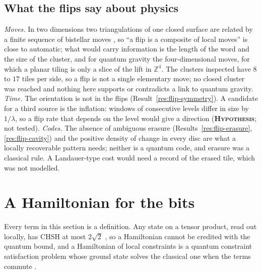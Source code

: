 \documentclass[11pt]{article}
\newcommand{\hypo}{\textbf{\textsc{Hypothesis}}}
\theoremstyle{definition}
\begin{document}
\subsection{What the flips say about physics}\label{sec:flips-physics}
\emph{Moves.} In two dimensions two triangulations of one closed surface are related by a finite sequence of bistellar moves \cite{pachner1991}, so ``a flip is a composite of local moves'' is close to automatic; what would carry information is the length of the word and the size of the cluster, and for quantum gravity the four-dimensional moves, for which a planar tiling is only a slice of the lift in $\mathbb{Z}^4$. The clusters inspected have $8$ to $17$ tiles per side, so a flip is not a single elementary move; no closed cluster was reached and nothing here supports or contradicts a link to quantum gravity.
\emph{Time.} The orientation is not in the flips (Result~\ref{res:flip-symmetry}). A candidate for a third source is the inflation: windows of consecutive levels differ in size by $1/\lambda$, so a flip rate that depends on the level would give a direction (\hypo; not tested).
\emph{Codes.} The absence of ambiguous erasure (Results~\ref{res:flip-erasure}, \ref{res:flip-cavity}) and the positive density of change in every disc are what a locally recoverable pattern needs; neither is a quantum code, and erasure was a classical rule. A Landauer-type cost \cite{landauer1961} would need a record of the erased tile, which was not modelled.

\section{A Hamiltonian for the bits}\label{sec:ham}
Every term in this section is a definition. Any state on a tensor product, read out locally, has CHSH at most $2\sqrt2$ \cite{cirelson1980}, so a Hamiltonian cannot be credited with the quantum bound, and a Hamiltonian of local constraints is a quantum constraint satisfaction problem whose ground state solves the classical one when the terms commute \cite{gharibian2015}.
\end{document}
